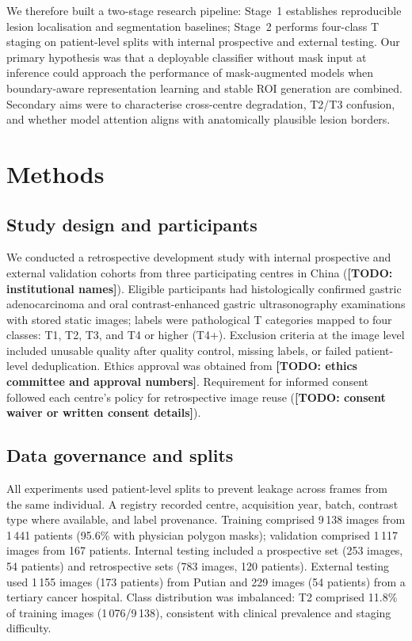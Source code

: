 \documentclass[11pt,a4paper]{article}
\newcommand{\todo}[1]{\textbf{[TODO: #1]}}
\begin{document}
We therefore built a two-stage research pipeline: Stage~1 establishes reproducible lesion localisation and segmentation baselines; Stage~2 performs four-class T staging on patient-level splits with internal prospective and external testing. Our primary hypothesis was that a deployable classifier without mask input at inference could approach the performance of mask-augmented models when boundary-aware representation learning and stable ROI generation are combined. Secondary aims were to characterise cross-centre degradation, T2/T3 confusion, and whether model attention aligns with anatomically plausible lesion borders.

\section{Methods}

\subsection{Study design and participants}
We conducted a retrospective development study with internal prospective and external validation cohorts from three participating centres in China (\todo{institutional names}). Eligible participants had histologically confirmed gastric adenocarcinoma and oral contrast-enhanced gastric ultrasonography examinations with stored static images; labels were pathological T categories mapped to four classes: T1, T2, T3, and T4 or higher (T4+). Exclusion criteria at the image level included unusable quality after quality control, missing labels, or failed patient-level deduplication. Ethics approval was obtained from \todo{ethics committee and approval numbers}. Requirement for informed consent followed each centre's policy for retrospective image reuse (\todo{consent waiver or written consent details}).

\subsection{Data governance and splits}
All experiments used patient-level splits to prevent leakage across frames from the same individual. A registry recorded centre, acquisition year, batch, contrast type where available, and label provenance. Training comprised 9\,138 images from 1\,441 patients (95.6\% with physician polygon masks); validation comprised 1\,117 images from 167 patients. Internal testing included a prospective set (253 images, 54 patients) and retrospective sets (783 images, 120 patients). External testing used 1\,155 images (173 patients) from Putian and 229 images (54 patients) from a tertiary cancer hospital. Class distribution was imbalanced: T2 comprised 11.8\% of training images (1\,076/9\,138), consistent with clinical prevalence and staging difficulty.
\end{document}
